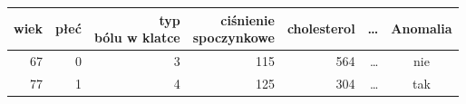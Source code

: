 \begin{tabular}{rrrrrrc}
\toprule
wiek & płeć & \makecell{typ\\bólu w klatce} & \makecell{ciśnienie\\spoczynkowe} & cholesterol & \dots & Anomalia \\
\midrule
67 & 0 & 3 & 115 & 564 & \dots & nie \\
77 & 1 & 4 & 125 & 304 & \dots & tak \\
\bottomrule
\end{tabular}
